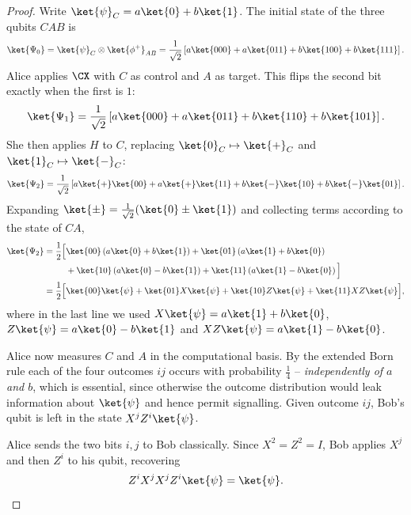 \begin{proof}
	Write $\ket{\psi}_C = a\ket{0}+b\ket{1}$. The initial state of the three qubits $CAB$ is
	$$\ket{\Psi_0} = \ket{\psi}_C\otimes\ket{\phi^+}_{AB} = \frac{1}{\sqrt2}\left[a\ket{000} + a\ket{011} + b\ket{100}+b\ket{111}\right].$$
	Alice applies $\CX$ with $C$ as control and $A$ as target. This flips the second bit exactly when the first is $1$:
	$$\ket{\Psi_1} = \frac{1}{\sqrt2}\left[a\ket{000}+a\ket{011}+b\ket{110}+b\ket{101}\right].$$
	She then applies $H$ to $C$, replacing $\ket{0}_C\mapsto\ket{+}_C$ and $\ket{1}_C\mapsto\ket{-}_C$:
	$$\ket{\Psi_2} = \frac1{\sqrt2}\left[a\ket{+}\ket{00}+a\ket{+}\ket{11}+b\ket{-}\ket{10}+b\ket{-}\ket{01}\right].$$
	Expanding $\ket{\pm} = \tfrac1{\sqrt2}(\ket{0}\pm\ket{1})$ and collecting terms according to the state of $CA$,
	\begin{align*}
		\ket{\Psi_2} = \frac{1}{2}\Big[&\ket{00}\left(a\ket{0}+b\ket{1}\right) + \ket{01}\left(a\ket{1}+b\ket{0}\right) \\
		&+\ket{10}\left(a\ket{0}-b\ket{1}\right)+\ket{11}\left(a\ket{1}-b\ket{0}\right)\Big] \\
		= \frac12\Big[&\ket{00}\ket{\psi} + \ket{01}X\ket{\psi} + \ket{10}Z\ket{\psi} + \ket{11}XZ\ket{\psi}\Big],
	\end{align*}
	where in the last line we used $X\ket{\psi} = a\ket{1}+b\ket{0}$, $Z\ket{\psi} = a\ket{0}-b\ket{1}$ and $XZ\ket{\psi} = a\ket{1}-b\ket{0}$.

	Alice now measures $C$ and $A$ in the computational basis. By the extended Born rule each of the four outcomes $ij$ occurs with probability $\tfrac14$ -- \emph{independently of $a$ and $b$}, which is essential, since otherwise the outcome distribution would leak information about $\ket{\psi}$ and hence permit signalling. Given outcome $ij$, Bob's qubit is left in the state $X^jZ^i\ket{\psi}$.

	Alice sends the two bits $i,j$ to Bob classically. Since $X^2 = Z^2 = I$, Bob applies $X^j$ and then $Z^i$ to his qubit, recovering
	$$Z^iX^jX^jZ^i\ket{\psi} = \ket{\psi}. \qedhere$$
\end{proof}

\begin{center}
\end{center}

